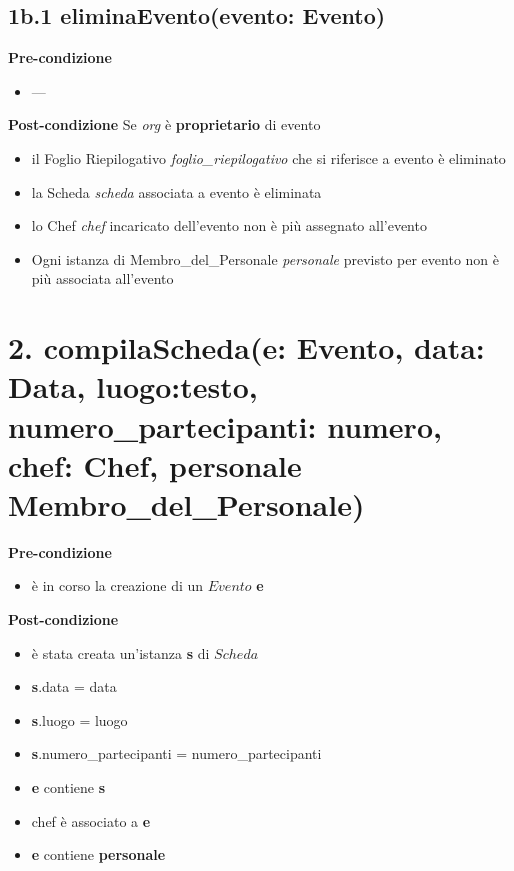 \documentclass[12pt]{extarticle}
\begin{document}
\subsection*{1b.1 eliminaEvento(evento: Evento)}

\textbf{Pre-condizione}
\begin{itemize}
  \item ---
\end{itemize}
\textbf{Post-condizione} Se \textit{org} è \textbf{proprietario} di evento
\begin{itemize}
  \item il Foglio Riepilogativo \textit{foglio\_riepilogativo} che si riferisce a evento è eliminato
  \item la Scheda \textit{scheda} associata a evento è eliminata
  \item lo Chef \textit{chef} incaricato dell'evento non è più assegnato all'evento
  \item Ogni istanza di Membro\_del\_Personale \textit{personale} previsto per evento non è più associata all'evento
\end{itemize}


\section*{2. compilaScheda(e: Evento, data: Data, luogo:testo, numero\_partecipanti: numero, chef: Chef, personale Membro\_del\_Personale)}

\textbf{Pre-condizione}
\begin{itemize}
  \item è in corso la creazione di un $Evento$ \textbf{e}
\end{itemize} 
\textbf{Post-condizione} 
\begin{itemize}
  \item è stata creata un'istanza \textbf{s} di $Scheda$
  \item \textbf{s}.data = data
  \item \textbf{s}.luogo = luogo
  \item \textbf{s}.numero\_partecipanti = numero\_partecipanti
  \item \textbf{e} contiene \textbf{s}
  \item chef è associato a \textbf{e}
  \item \textbf{e} contiene \textbf{personale}
\end{itemize}
\end{document}
